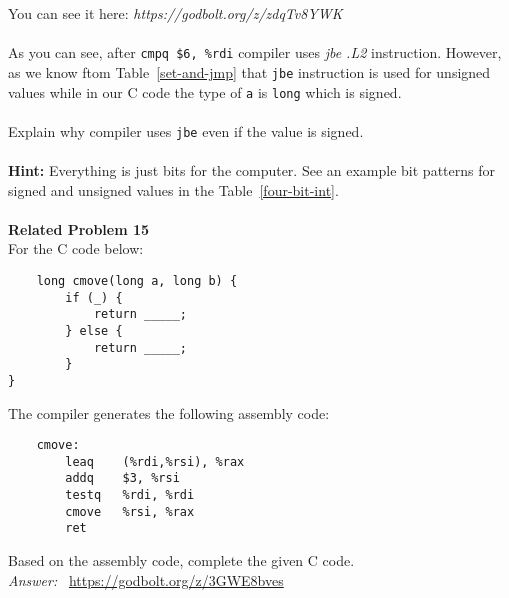 You can see it here: \textit{https://godbolt.org/z/zdqTv8YWK} \\
\\
As you can see, after \texttt{cmpq \$6, \%rdi} compiler uses \textit{jbe    .L2} 
instruction.  However, as we know ftom Table~\ref{set-and-jmp} that \texttt{jbe} instruction 
is used for unsigned values while in our C code the type of \texttt{a} is \texttt{long} which 
is signed. \\
\\
Explain why compiler uses \texttt{jbe} even if the value is signed. \\
\\
\textbf{Hint:} Everything is just bits for the computer. See an example bit 
patterns for signed and unsigned values in the Table~\ref{four-bit-int}. \\
\\
\noindent\textbf{Related Problem 15} \\
For the C code below:
\begin{verbatim}
    long cmove(long a, long b) {
        if (_) {
            return _____;
        } else {
            return _____;
        }
}
\end{verbatim}
The compiler generates the following assembly code: 
\begin{verbatim}
    cmove:
        leaq    (%rdi,%rsi), %rax
        addq    $3, %rsi
        testq   %rdi, %rdi
        cmove   %rsi, %rax
        ret
\end{verbatim}
Based on the assembly code, complete the given C code. \\

\noindent\textit{Answer: }~\url{https://godbolt.org/z/3GWE8bves} \\
